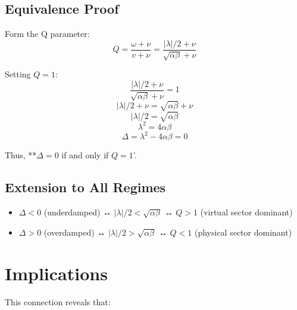 \documentclass[11pt]{article}
\begin{document}
\subsection{Equivalence Proof}
Form the Q parameter:
$$Q = \frac{\omega + \nu}{v + \nu} = \frac{|\lambda|/2 + \nu}{\sqrt{\alpha\beta} + \nu}$$

Setting $Q = 1$:
$$\frac{|\lambda|/2 + \nu}{\sqrt{\alpha\beta} + \nu} = 1$$
$$|\lambda|/2 + \nu = \sqrt{\alpha\beta} + \nu$$
$$|\lambda|/2 = \sqrt{\alpha\beta}$$
$$\lambda^2 = 4\alpha\beta$$
$$\Delta = \lambda^2 - 4\alpha\beta = 0$$

Thus, **$\Delta = 0$ if and only if $Q = 1$'.

\subsection{Extension to All Regimes}
\begin{itemize}
\item $\Delta < 0$ (underdamped) ↔ $|\lambda|/2 < \sqrt{\alpha\beta}$ ↔ $Q > 1$ (virtual sector dominant)
\item $\Delta > 0$ (overdamped) ↔ $|\lambda|/2 > \sqrt{\alpha\beta}$ ↔ $Q < 1$ (physical sector dominant)
\end{itemize}

\section{Implications}

This connection reveals that:
\end{document}
